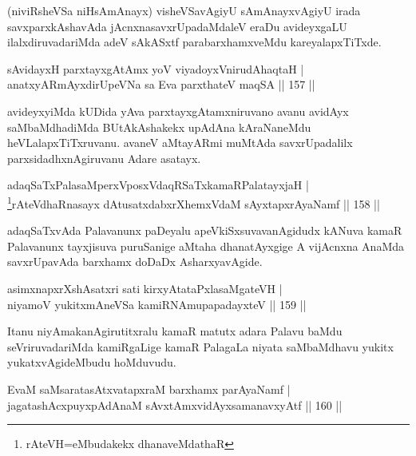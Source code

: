 \begin{artha}%
(niviRsheVSa niHsAmAnayx) visheVSavAgiyU sAmAnayxvAgiyU irada savxparxkAshavAda jAcnxnasavxrUpadaMdaleV eraDu avideyxgaLU ilalxdiruvadariMda adeV sAkASxtf parabarxhamxveMdu kareyalapxTiTxde.
\end{artha}

\begin{shl}
sAvidayxH parxtayxgAtAmx yoV viyadoyxVnirudAhaqtaH |\\
anatxyARmAyxdirUpeVNa sa Eva parxthateV maqSA \hfill || 157 ||
\end{shl}

\begin{artha}
avideyxyiMda kUDida yAva parxtayxgAtamxniruvano avanu avidAyx saMbaMdhadiMda BUtAkAshakekx upAdAna kAraNaneMdu heVLalapxTiTxruvanu. avaneV aMtayARmi muMtAda savxrUpadalilx parxsidadhxnAgiruvanu Adare asatayx.
\end{artha}

\begin{shl}
adaqSaTxPalasaMperxVposxVdaqRSaTxkamaRPalatayxjaH |\\
\footnote{rAteVH=eMbudakekx dhanaveMdathaR}rAteVdhaRnasayx dAtusatxdabxrXhemxVdaM sAyxtapxrAyaNamf \hfill || 158 ||
\end{shl}

\begin{artha}
adaqSaTxvAda Palavanunx paDeyalu apeVkiSxsuvavanAgidudx kANuva kamaR Palavanunx tayxjisuva puruSanige aMtaha dhanatAyxgige A vijAcnxna AnaMda savxrUpavAda barxhamx doDaDx AsharxyavAgide.
\end{artha}

\begin{shl}
asimxnapxrXshAsatxri sati kirxyAtataPxlasaMgateVH |\\
niyamoV yukitxmAneVSa kamiRNAmupapadayxteV \hfill || 159 ||
\end{shl}

\begin{artha}
Itanu niyAmakanAgirutitxralu kamaR matutx adara Palavu baMdu seVriruvadariMda kamiRgaLige kamaR PalagaLa niyata saMbaMdhavu yukitx yukatxvAgideMbudu hoMduvudu.
\end{artha}

\begin{shl}
EvaM saMsaratasAtxvatapxraM barxhamx parAyaNamf |\\
jagatashAcxpuyxpAdAnaM sAvxtAmxvidAyxsamanavxyAtf \hfill || 160 ||
\end{shl}

